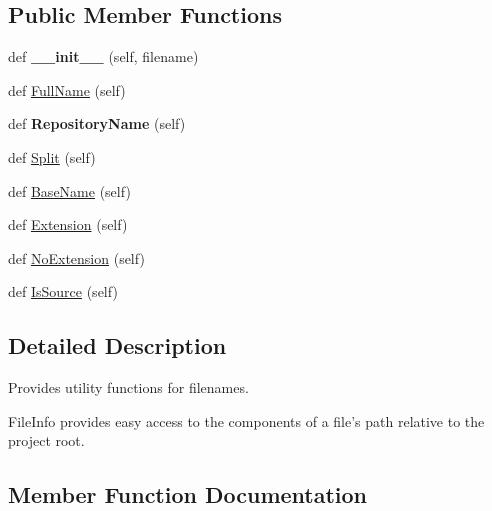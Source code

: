 \subsection*{Public Member Functions}
\begin{DoxyCompactItemize}
\item 
def {\bfseries \+\_\+\+\_\+init\+\_\+\+\_\+} (self, filename)\hypertarget{classcpplint_1_1FileInfo_abd3ff77aab027af2476b3a1d97b1f89c}{}\label{classcpplint_1_1FileInfo_abd3ff77aab027af2476b3a1d97b1f89c}

\item 
def \hyperlink{classcpplint_1_1FileInfo_aed56577368c45cdf45fc4c9109129145}{Full\+Name} (self)
\item 
def {\bfseries Repository\+Name} (self)\hypertarget{classcpplint_1_1FileInfo_a2b3b79b7d46221a6b9d0ea0bebac2061}{}\label{classcpplint_1_1FileInfo_a2b3b79b7d46221a6b9d0ea0bebac2061}

\item 
def \hyperlink{classcpplint_1_1FileInfo_a43f1c5ff1771da52e29c60c114955e72}{Split} (self)
\item 
def \hyperlink{classcpplint_1_1FileInfo_a1a12ed63ddc2ffd8f6a105e3ab4d6289}{Base\+Name} (self)
\item 
def \hyperlink{classcpplint_1_1FileInfo_a2554b504117839931e901b59a59c67ae}{Extension} (self)
\item 
def \hyperlink{classcpplint_1_1FileInfo_acb46555a72b346966f4bf28c08e3b1fa}{No\+Extension} (self)
\item 
def \hyperlink{classcpplint_1_1FileInfo_a157f8d3266d7291321db88cdad3b2879}{Is\+Source} (self)
\end{DoxyCompactItemize}


\subsection{Detailed Description}
\begin{DoxyVerb}Provides utility functions for filenames.

FileInfo provides easy access to the components of a file's path
relative to the project root.
\end{DoxyVerb}
 

\subsection{Member Function Documentation}
